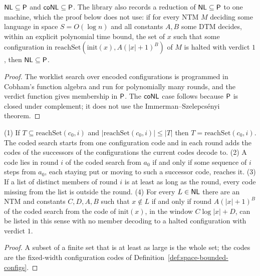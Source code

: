 \begin{theorem}[$\cc{NL} \subseteq \cc{P}$]
  \label{thm:space-NL-subset-P}
  \leanok
  $\cc{NL} \subseteq \cc{P}$ and $\mathsf{coNL} \subseteq \mathsf{P}$. The library also
  records a reduction of $\cc{NL} \subseteq \cc{P}$ to one machine, which the
  proof below does not use: if for every NTM $M$ deciding some language in
  space $S = O(\log n)$ and all constants $A, B$ some DTM decides, within an
  explicit polynomial time bound, the set of $x$ such that some configuration
  in $\mathrm{reachSet}(\mathrm{init}(x), A(|x| + 1)^B)$ of $M$ is halted with
  verdict $1$, then $\cc{NL} \subseteq \cc{P}$.
\end{theorem}
\begin{proof}
  \leanok
  The worklist search over encoded configurations is programmed in Cobham's
  function algebra and run for polynomially many rounds, and the verdict
  function gives membership in $\mathsf{P}$. The $\mathsf{coNL}$ case follows because
  $\mathsf{P}$ is closed under complement; it does not use the
  Immerman--Szelepcs\'enyi theorem.
\end{proof}

\begin{lemma}
  \label{lem:space-inductive-counting}
  \leanok
  (1) If $T \subseteq \mathrm{reachSet}(c_0, i)$ and
  $|\mathrm{reachSet}(c_0, i)| \le |T|$ then $T = \mathrm{reachSet}(c_0, i)$.
  The coded search starts from one configuration code and in each round adds
  the codes of the successors of the configurations the current codes decode
  to. (2) A code lies in round $i$ of the coded search from $a_0$ if and only if
  some sequence of $i$ steps from $a_0$, each staying put or moving to such a
  successor code, reaches it. (3) If a list of distinct members of round $i$
  is at least as long as the round, every code missing from the list is
  outside the round. (4) For every $L \in \mathsf{NL}$ there are an NTM and
  constants $C, D, A, B$ such that $x \notin L$ if and only if round
  $A(|x| + 1)^B$ of the coded search from the code of $\mathrm{init}(x)$, in
  the window $C \log |x| + D$, can be listed in this sense with no member
  decoding to a halted configuration with verdict $1$.
\end{lemma}
\begin{proof}
  \leanok
  A subset of a finite set that is at least as large is the whole set; the
  codes are the fixed-width configuration codes of
  Definition~\ref{def:space-bounded-configs}.
\end{proof}

